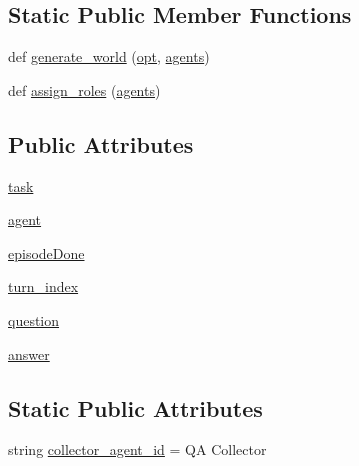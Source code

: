 \subsection*{Static Public Member Functions}
\begin{DoxyCompactItemize}
\item 
def \hyperlink{classparlai_1_1messenger_1_1tasks_1_1qa__data__collection_1_1worlds_1_1QADataCollectionTaskWorld_a5d78edfdf7dc7ccf8480f778c2d02c77}{generate\+\_\+world} (\hyperlink{classparlai_1_1core_1_1worlds_1_1World_a3640d92718acd3e6942a28c1ab3678bd}{opt}, \hyperlink{classparlai_1_1core_1_1worlds_1_1World_a728f75194cc26ea4035047c46cf62608}{agents})
\item 
def \hyperlink{classparlai_1_1messenger_1_1tasks_1_1qa__data__collection_1_1worlds_1_1QADataCollectionTaskWorld_a1f559bd00fc9fe306b6ea0c7ab83c0d1}{assign\+\_\+roles} (\hyperlink{classparlai_1_1core_1_1worlds_1_1World_a728f75194cc26ea4035047c46cf62608}{agents})
\end{DoxyCompactItemize}
\subsection*{Public Attributes}
\begin{DoxyCompactItemize}
\item 
\hyperlink{classparlai_1_1messenger_1_1tasks_1_1qa__data__collection_1_1worlds_1_1QADataCollectionTaskWorld_a67869aa6d9b089a564def261cbd9b3e1}{task}
\item 
\hyperlink{classparlai_1_1messenger_1_1tasks_1_1qa__data__collection_1_1worlds_1_1QADataCollectionTaskWorld_a5552d7b22f7a5c07aa7f4485f7a02bc7}{agent}
\item 
\hyperlink{classparlai_1_1messenger_1_1tasks_1_1qa__data__collection_1_1worlds_1_1QADataCollectionTaskWorld_a1ff4f685cd0667d1338b845966ad3f6e}{episode\+Done}
\item 
\hyperlink{classparlai_1_1messenger_1_1tasks_1_1qa__data__collection_1_1worlds_1_1QADataCollectionTaskWorld_a1b2d3b83553a2add0ae517588bbcc007}{turn\+\_\+index}
\item 
\hyperlink{classparlai_1_1messenger_1_1tasks_1_1qa__data__collection_1_1worlds_1_1QADataCollectionTaskWorld_adc62351cf97c0e7a98936264d371e583}{question}
\item 
\hyperlink{classparlai_1_1messenger_1_1tasks_1_1qa__data__collection_1_1worlds_1_1QADataCollectionTaskWorld_ae1ad373febd7b56249f447204b40e5f4}{answer}
\end{DoxyCompactItemize}
\subsection*{Static Public Attributes}
\begin{DoxyCompactItemize}
\item 
string \hyperlink{classparlai_1_1messenger_1_1tasks_1_1qa__data__collection_1_1worlds_1_1QADataCollectionTaskWorld_af3e93a933f5753746f2c88a349391449}{collector\+\_\+agent\+\_\+id} = \textquotesingle{}QA Collector\textquotesingle{}
\end{DoxyCompactItemize}


